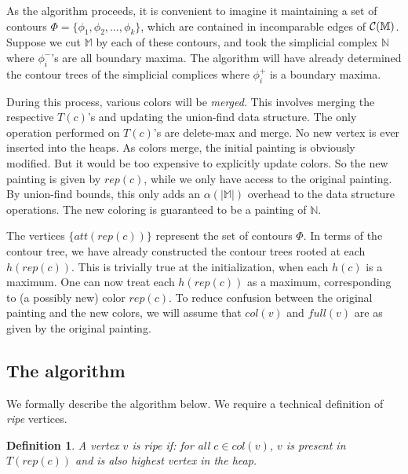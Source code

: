 \documentclass[11pt]{article}
\newtheorem{definition}[theorem]{Definition}
\theoremstyle{definition}
\newcommand{\cC}{{\cal C}}
\newcommand{\MM}{\mathbb{M}}
\newcommand{\NN}{\mathbb{N}}
\newcommand{\col}{col}
\newcommand{\fcol}{full}
\newcommand{\h}{att}
\newcommand{\rep}{rep}
\begin{document}
\medskip
As the algorithm proceeds, it is convenient to imagine
it maintaining a set of contours $\Phi = \{\phi_1, \phi_2, \ldots, \phi_k\}$, which are contained
in incomparable edges of $\cC(\MM)$. Suppose we cut $\MM$ by each of these contours, and took
the simplicial complex $\NN$ where $\phi^-_i$'s are all boundary maxima. The algorithm will
have already determined the contour trees of the simplicial complices
where $\phi^+_i$ is a boundary maxima. 

During this process, various colors will be \emph{merged}. This involves merging the respective $T(c)$'s and
updating the union-find data structure. The only operation performed on $T(c)$'s are delete-max and merge.
No new vertex is ever inserted into the heaps. As colors merge, the initial painting is obviously modified.
But it would be too expensive to explicitly update colors. So the new painting is given by $\rep(c)$,
while we only have access to the original painting. By union-find bounds, this only adds an $\alpha(|\MM|)$
overhead to the data structure operations. The new coloring is guaranteed to be a painting of $\NN$.

The vertices $\{\h(\rep(c))\}$ represent the set of contours $\Phi$. In terms of the contour tree, 
we have already constructed the contour trees rooted at each $h(\rep(c))$. This is trivially true at the initialization,
when each $h(c)$ is a maximum. One can now treat each $h(\rep(c))$ as a maximum, corresponding to (a possibly new) color $\rep(c)$.
To reduce confusion between the original painting and the new colors, we will assume that $\col(v)$ and $\fcol(v)$
are as given by the original painting. 
	
\subsection{The algorithm} \label{sec:algo}

We formally describe the algorithm below. We require a technical definition of \emph{ripe} vertices.


\begin{definition} \label{def:ripe} A vertex $v$ is \emph{ripe} if: for all $c \in \col(v)$, $v$
is present in $T(\rep(c))$ and is also highest vertex in the heap. 
\end{definition} 
\end{document}
